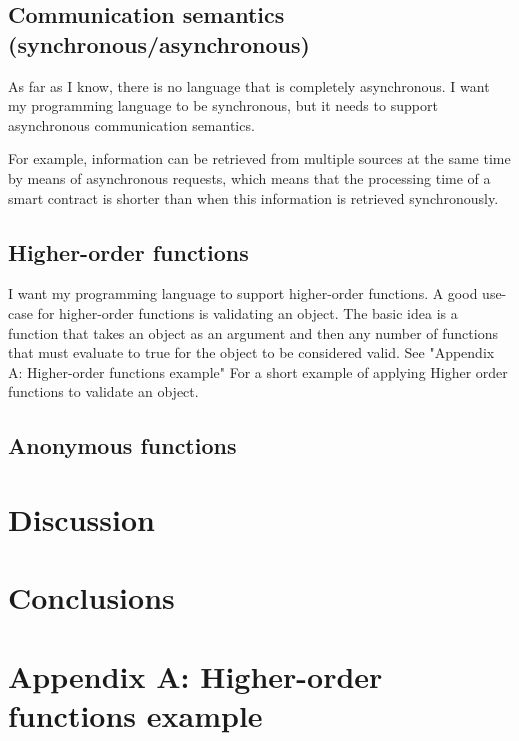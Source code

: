 \documentclass{uva-inf-article}
\begin{document}
\subsection{Communication semantics (synchronous/asynchronous)}
As far as I know, there is no language that is completely asynchronous. 
I want my programming language to be synchronous, but it needs to support asynchronous communication semantics.

For example, information can be retrieved from multiple sources at the same time by means of asynchronous requests, 
which means that the processing time of a smart contract is shorter than when this information is retrieved synchronously.

\subsection{Higher-order functions}
I want my programming language to support higher-order functions.
A good use-case for higher-order functions is validating an object.
The basic idea is a function that takes an object as an argument and then any number of 
functions that must evaluate to true for the object to be considered valid.
See "Appendix A: Higher-order functions example" For a short example of applying 
Higher order functions to validate an object.

\subsection{Anonymous functions}

\section{Discussion}

\section{Conclusions}


\printbibliography

\newpage
\section{Appendix A: Higher-order functions example}

\end{document}
